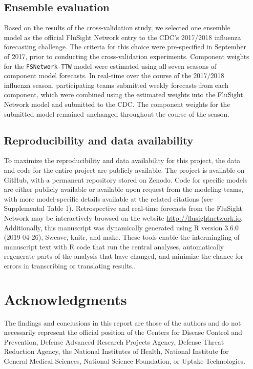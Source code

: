 \documentclass{article}\usepackage[]{graphicx}\usepackage[]{color}
\begin{document}
\subsection*{Ensemble evaluation}

Based on the results of the cross-validation study, we selected one ensemble model as the official FluSight Network entry to the CDC's 2017/2018 influenza forecasting challenge.
The criteria for this choice were pre-specified in September of 2017, prior to conducting the cross-validation experiments.\cite{Reich2017github} 
Component weights for the {\tt FSNetwork-TTW} model were estimated using all seven seasons of component model forecasts. In real-time over the course of the 2017/2018 influenza season, participating teams submitted weekly forecasts from each component, which were combined using the estimated weights into the FluSight Network model and submitted to the CDC. The component weights for the submitted model remained unchanged throughout the course of the season.

\subsection*{Reproducibility and data availability}

To maximize the reproducibility and data availability for this project, the data and code for the entire project are publicly available.
The project is available on GitHub\cite{fsngithub2018}, with a permanent repository stored on Zenodo\cite{fsnzenodo2018}.
Code for specific models are either publicly available or available upon request from the modeling teams, with more model-specific details available at the related citations (see Supplemental Table 1).
Retrospective and real-time forecasts from the FluSight Network may be interactively browsed on the website \url{http://flusightnetwork.io}.
Additionally, this manuscript was dynamically generated using R version 3.6.0 (2019-04-26), Sweave, knitr, and make.
These tools enable the intermingling of manuscript text with R code that run the central analyses, automatically regenerate parts of the analysis that have changed, and minimize the chance for errors in transcribing or translating results.\cite{Xie2015,RCore2017}.


\section*{Acknowledgments}
The findings and conclusions in this report are those of the authors and do not necessarily represent the official position of the Centers for Disease Control and Prevention, Defense Advanced Research Projects Agency, Defense Threat Reduction Agency, the National Institutes of Health, National Institute for General Medical Sciences, National Science Foundation, or Uptake Technologies.
\end{document}
